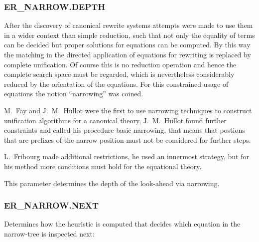 \subsubsection{ER\_NARROW.DEPTH}
  
\label{ernarrowdepth}


After the discovery of canonical rewrite systems attempts were made to use
them in a wider context than simple reduction, such that not only the
equality of terms can be decided but proper solutions for equations can be
computed. By this way the matching in the directed application of equations
for rewriting is replaced by complete unification. Of course this is no
reduction operation and hence the complete search space must be regarded,
which is nevertheless considerably reduced by the orientation of the
equations. For this constrained usage of equations the notion ``narrowing'' was
coined.

M.\ Fay and J.\ M.\ Hullot \cite{Fay79,Hullot80} were the first
to use narrowing techniques to construct unification 
algorithms for a  canonical theory, J.\ M.\ Hullot found further
constraints and called his procedure basic narrowing, that means 
that postions that are prefixes of the narrow position must 
not be considered for further steps.

L.\ Fribourg \cite{Fribourg84,Fribourg85a,Fribourg85b} made additional
restrictions, he used an innermost strategy, but for his method
more conditions must hold for the equational theory. 

This parameter determines the depth of the look-ahead via narrowing.

\PO


\subsubsection{ER\_NARROW.NEXT}
  

    Determines how the heuristic is computed that decides which
equation in the narrow-tree is inspected next:

\PO
{}

